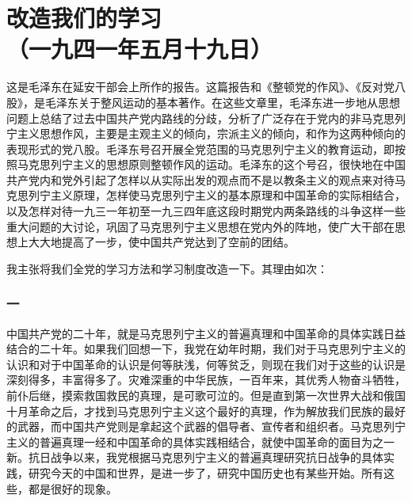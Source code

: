 \documentclass[cn,11pt,chinese]{elegantbook}
\def\myformat#1{\hfil\hfil #1}
\begin{document}
\newpage\section*{\myformat{改造我们的学习}\\\myformat{（一九四一年五月十九日）}}
\begin{introduction}\item  这是毛泽东在延安干部会上所作的报告。这篇报告和《整顿党的作风》、《反对党八股》，是毛泽东关于整风运动的基本著作。在这些文章里，毛泽东进一步地从思想问题上总结了过去中国共产党内路线的分歧，分析了广泛存在于党内的非马克思列宁主义思想作风，主要是主观主义的倾向，宗派主义的倾向，和作为这两种倾向的表现形式的党八股。毛泽东号召开展全党范围的马克思列宁主义的教育运动，即按照马克思列宁主义的思想原则整顿作风的运动。毛泽东的这个号召，很快地在中国共产党内和党外引起了怎样以从实际出发的观点而不是以教条主义的观点来对待马克思列宁主义原理，怎样使马克思列宁主义的基本原理和中国革命的实际相结合，以及怎样对待一九三一年初至一九三四年底这段时期党内两条路线的斗争这样一些重大问题的大讨论，巩固了马克思列宁主义思想在党内外的阵地，使广大干部在思想上大大地提高了一步，使中国共产党达到了空前的团结。\end{introduction}
我主张将我们全党的学习方法和学习制度改造一下。其理由如次：\\
\subsubsection*{\myformat{一}}
中国共产党的二十年，就是马克思列宁主义的普遍真理和中国革命的具体实践日益结合的二十年。如果我们回想一下，我党在幼年时期，我们对于马克思列宁主义的认识和对于中国革命的认识是何等肤浅，何等贫乏，则现在我们对于这些的认识是深刻得多，丰富得多了。灾难深重的中华民族，一百年来，其优秀人物奋斗牺牲，前仆后继，摸索救国救民的真理，是可歌可泣的。但是直到第一次世界大战和俄国十月革命之后，才找到马克思列宁主义这个最好的真理，作为解放我们民族的最好的武器，而中国共产党则是拿起这个武器的倡导者、宣传者和组织者。马克思列宁主义的普遍真理一经和中国革命的具体实践相结合，就使中国革命的面目为之一新。抗日战争以来，我党根据马克思列宁主义的普遍真理研究抗日战争的具体实践，研究今天的中国和世界，是进一步了，研究中国历史也有某些开始。所有这些，都是很好的现象。\\
\end{document}
